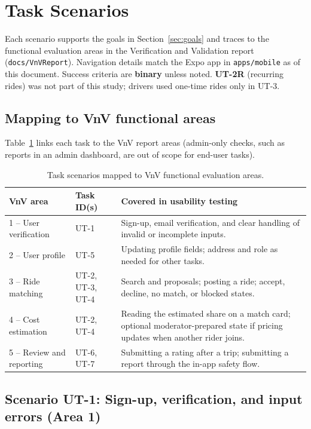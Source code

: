 \section{Task Scenarios}
\label{sec:task_scenarios}

Each scenario supports the goals in Section~\ref{sec:goals} and traces to the functional evaluation areas in the Verification and Validation report (\texttt{docs/VnVReport}). Navigation details match the Expo app in \texttt{apps/mobile} as of this document. Success criteria are \textbf{binary} unless noted. \textbf{UT-2R} (recurring rides) was not part of this study; drivers used one-time rides only in UT-3.

\subsection{Mapping to VnV functional areas}

Table~\ref{tab:vnv_ut_map} links each task to the VnV report areas (admin-only checks, such as reports in an admin dashboard, are out of scope for end-user tasks).

\begin{table}[htbp]
  \centering
  \caption{Task scenarios mapped to VnV functional evaluation areas.}
  \label{tab:vnv_ut_map}
  \begin{tabularx}{\textwidth}{l l X}
    \toprule
    \textbf{VnV area} & \textbf{Task ID(s)} & \textbf{Covered in usability testing}\\
    \midrule
    1 -- User verification & UT-1 & Sign-up, email verification, and clear handling of invalid or incomplete inputs.\\
    2 -- User profile & UT-5 & Updating profile fields; address and role as needed for other tasks.\\
    3 -- Ride matching & UT-2, UT-3, UT-4 & Search and proposals; posting a ride; accept, decline, no match, or blocked states.\\
    4 -- Cost estimation & UT-2, UT-4 & Reading the estimated share on a match card; optional moderator-prepared state if pricing updates when another rider joins.\\
    5 -- Review and reporting & UT-6, UT-7 & Submitting a rating after a trip; submitting a report through the in-app safety flow.\\
    \bottomrule
  \end{tabularx}
\end{table}

\subsection{Scenario UT-1: Sign-up, verification, and input errors (Area 1)}

